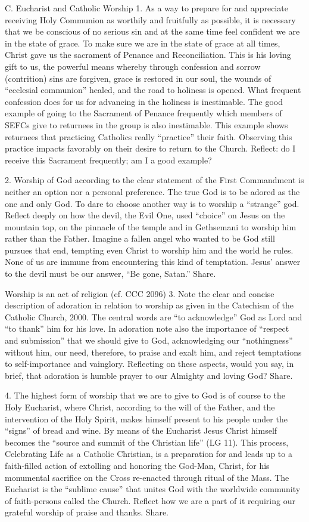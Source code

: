 \documentclass[oneside]{book}
\begin{document}
C. Eucharist and Catholic Worship
1. As a way to prepare for and appreciate receiving Holy Communion as worthily
and fruitfully as possible, it is necessary that we be conscious of no serious
sin and at the same time feel confident we are in the state of grace. To make
sure we are in the state of grace at all times, Christ gave us the sacrament of
Penance and Reconciliation. This is his loving gift to us, the powerful means
whereby through confession and sorrow (contrition) sins are forgiven, grace is
restored in our soul, the wounds of ``ecclesial communion'' healed, and the road
to holiness is opened. What frequent confession does for us for advancing in the
holiness is inestimable.
The good example of going to the Sacrament of Penance frequently which members
of SEFCs give to returnees in the group is also inestimable. This example shows
returnees that practicing Catholics really ``practice'' their faith. Observing
this practice impacts favorably on their desire to return to the
Church. Reflect: do I receive this Sacrament frequently; am I a good example?

2. Worship of God according to the clear statement of the First Commandment is
neither an option nor a personal preference. The true God is to be adored as the
one and only God. To dare to choose another way is to worship a ``strange''
god. Reflect deeply on how the devil, the Evil One, used ``choice'' on Jesus on
the mountain top, on the pinnacle of the temple and in Gethsemani to worship him
rather than the Father. Imagine a fallen angel who wanted to be God still
pursues that end, tempting even Christ to worship him and the world he
rules. None of us are immune from encountering this kind of temptation. Jesus'
answer to the devil must be our answer, ``Be gone, Satan.'' Share.

Worship is an act of religion (cf. CCC 2096)
3. Note the clear and concise description of adoration in relation to worship as
given in the Catechism of the Catholic Church, 2000. The central words are ``to
acknowledge'' God as Lord and ``to thank'' him for his love. In adoration note
also the importance of ``respect and submission'' that we should give to God,
acknowledging our ``nothingness'' without him, our need, therefore, to praise
and exalt him, and reject temptations to self-importance and
vainglory. Reflecting on these aspects, would you say, in brief, that adoration
is humble prayer to our Almighty and loving God? Share.

4. The highest form of worship that we are to give to God is of course to the
Holy Eucharist, where Christ, according to the will of the Father, and the
intervention of the Holy Spirit, makes himself present to his people under the
``signs'' of bread and wine. By means of the Eucharist Jesus Christ himself
becomes the ``source and summit of the Christian life'' (LG 11). This process,
Celebrating Life as a Catholic Christian, is a preparation for and leads up to a
faith-filled action of extolling and honoring the God-Man, Christ, for his
monumental sacrifice on the Cross re-enacted through ritual of the Mass. The
Eucharist is the ``sublime cause'' that unites God with the worldwide community
of faith-persons called the Church. Reflect how we are a part of it requiring
our grateful worship of praise and thanks. Share.
\end{document}
